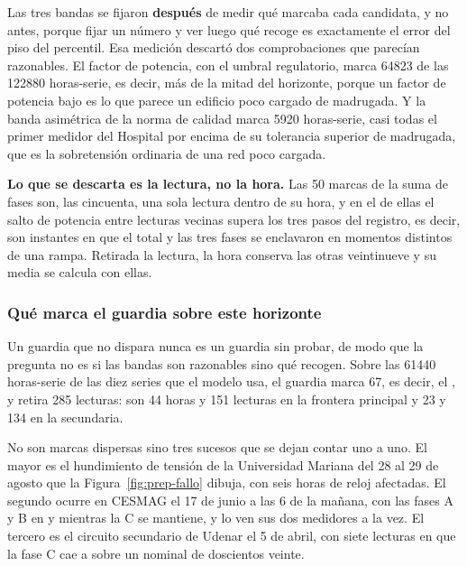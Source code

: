 Las tres bandas se fijaron \textbf{después} de medir qué marcaba cada
candidata, y no antes, porque fijar un número y ver luego qué recoge es
exactamente el error del piso del percentil. Esa medición descartó dos
comprobaciones que parecían razonables. El factor de potencia, con el
umbral regulatorio, marca \num{64823} de las \num{122880} horas-serie, es
decir, más de la mitad del horizonte, porque un factor de potencia bajo es
lo que parece un edificio poco cargado de madrugada. Y la banda asimétrica
de la norma de calidad marca \num{5920} horas-serie, casi todas el primer
medidor del Hospital por encima de su tolerancia superior de madrugada, que
es la sobretensión ordinaria de una red poco cargada.

\begin{lecturabox}
\textbf{Lo que se descarta es la lectura, no la hora.} Las \num{50} marcas
de la suma de fases son, las cincuenta, una sola lectura dentro de su hora,
y en el  de ellas el salto de potencia entre lecturas vecinas
supera los tres pasos del registro, es decir, son instantes en que el total
y las tres fases se enclavaron en momentos distintos de una rampa.
Retirada la lectura, la hora conserva las otras veintinueve y su media se
calcula con ellas.
\end{lecturabox}

\subsubsection*{Qué marca el guardia sobre este horizonte}

Un guardia que no dispara nunca es un guardia sin probar, de modo que la
pregunta no es si las bandas son razonables sino qué recogen. Sobre las
\num{61440} horas-serie de las diez series que el modelo usa, el guardia
marca \num{67}, es decir, el , y retira \num{285} lecturas: son
\num{44} horas y \num{151} lecturas en la frontera principal y \num{23} y
\num{134} en la secundaria.

No son marcas dispersas sino tres sucesos que se dejan contar uno a uno. El
mayor es el hundimiento de tensión de la Universidad Mariana del 28 al 29
de agosto que la Figura~\ref{fig:prep-fallo} dibuja, con seis horas de
reloj afectadas. El segundo ocurre en CESMAG el 17 de junio a las 6 de la
mañana, con las fases A y B en  y  mientras la C
se mantiene, y lo ven sus dos medidores a la vez. El tercero es el circuito
secundario de Udenar el 5 de abril, con siete lecturas en que la fase C cae
a  sobre un nominal de doscientos veinte.

